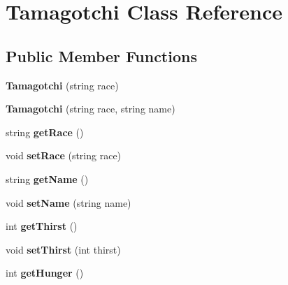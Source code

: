 \hypertarget{class_tamagotchi}{\section{Tamagotchi Class Reference}
\label{class_tamagotchi}
}
\subsection*{Public Member Functions}
\begin{DoxyCompactItemize}
\item 
\hypertarget{class_tamagotchi_a68e02db11318a74b4447692be556e192}{{\bfseries Tamagotchi} (string race)}\label{class_tamagotchi_a68e02db11318a74b4447692be556e192}

\item 
\hypertarget{class_tamagotchi_a1a74d8dcd5a9f9c69ba56c42a14f230f}{{\bfseries Tamagotchi} (string race, string name)}\label{class_tamagotchi_a1a74d8dcd5a9f9c69ba56c42a14f230f}

\item 
\hypertarget{class_tamagotchi_a58a5e5d584abea0853b7ef071d0ff5d6}{string {\bfseries get\+Race} ()}\label{class_tamagotchi_a58a5e5d584abea0853b7ef071d0ff5d6}

\item 
\hypertarget{class_tamagotchi_a1c45058ecf37a9eb0c44dc2cabb9b2dd}{void {\bfseries set\+Race} (string race)}\label{class_tamagotchi_a1c45058ecf37a9eb0c44dc2cabb9b2dd}

\item 
\hypertarget{class_tamagotchi_a63e02d9ec8436af27e91f8fd0c4accb8}{string {\bfseries get\+Name} ()}\label{class_tamagotchi_a63e02d9ec8436af27e91f8fd0c4accb8}

\item 
\hypertarget{class_tamagotchi_a3bae42842a3c29964aa5a5ebd129dd68}{void {\bfseries set\+Name} (string name)}\label{class_tamagotchi_a3bae42842a3c29964aa5a5ebd129dd68}

\item 
\hypertarget{class_tamagotchi_aab53af1bda3a4bf1806613df5b71a9a2}{int {\bfseries get\+Thirst} ()}\label{class_tamagotchi_aab53af1bda3a4bf1806613df5b71a9a2}

\item 
\hypertarget{class_tamagotchi_a1778e79b2c9699c024249b2094563e41}{void {\bfseries set\+Thirst} (int thirst)}\label{class_tamagotchi_a1778e79b2c9699c024249b2094563e41}

\item 
\hypertarget{class_tamagotchi_ac005f50a3f70eca7148ca3bc29c403ce}{int {\bfseries get\+Hunger} ()}\label{class_tamagotchi_ac005f50a3f70eca7148ca3bc29c403ce}


\end{DoxyCompactItemize}
